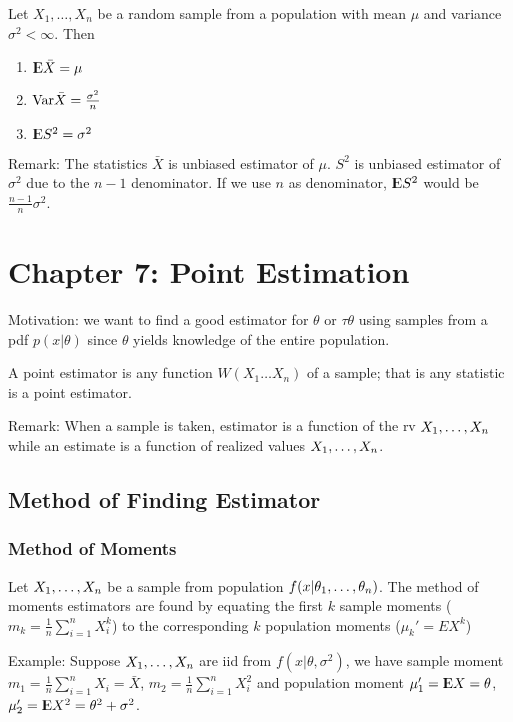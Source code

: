 \documentclass[12pt]{article}
\begin{document}
\begin{theorem}
	Let $X_1,\ldots, X_n$ be a random sample from a population with mean $\mu$ and variance $\sigma^2 < \infty$. Then
	\begin{enumerate}
		\item ${\rm I\kern-.3em E}\bar{X} = \mu$
		\item $\mathrm{Var} \bar{X} = \frac{\sigma^2}{n}$
		\item ${\rm I\kern-.3em E} S^2 = \sigma^2$
	\end{enumerate}
Remark: The statistics $\bar{X}$ is unbiased estimator of $\mu$. $S^2$ is unbiased estimator of $\sigma^2$ due to the $n-1$ denominator. If we use $n$ as denominator, ${\rm I\kern-.3em E} S^2$ would be $\frac{n-1}{n} \sigma^2$.
\end{theorem}
	
\section*{Chapter 7: Point Estimation}
Motivation: we want to find a good estimator for $\theta$ or $\tau{\theta}$ using samples from a pdf $p(x |\theta)$ since $\theta$ yields knowledge of the entire population.
	
\begin{definition}
	A point estimator is any function $W(X_1 \ldots X_n)$ of a sample; that is any statistic is a point estimator.
\end{definition}
Remark: When a sample is taken, estimator is a function of the rv $X_1,\ldots, X_n$ while an estimate is a function of realized values $X_1,\ldots, X_n$.

\subsection*{Method of Finding Estimator}
\subsubsection{Method of Moments}
\begin{theorem}
	Let $X_1,\ldots, X_n$ be a sample from population $f(x|\theta_1,\ldots, \theta_n)$. The method of moments estimators are found by equating the first $k$ sample moments ($m_k = \frac{1}{n}\sum^n_{i=1}X_i^k$) to the corresponding $k$ population moments ($\mu_k' = EX^k$)
\end{theorem}

Example: Suppose $X_1,\ldots, X_n$ are iid from $f(x|\theta, \sigma^2)$, we have sample moment $m_1 = \frac{1}{n}\sum^n_{i=1}X_i = \bar{X}$, $m_2 = \frac{1}{n} \sum^n_{i=1}X_i^2$ and population moment $\mu_1' = {\rm I\kern-.3em E} X = \theta$,  $\mu_2' = {\rm I\kern-.3em E} X^2 = \theta^2 + \sigma^2$.
\end{document}
